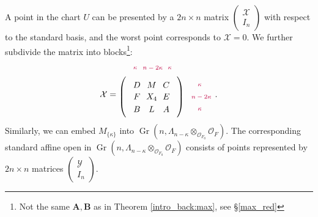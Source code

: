 \documentclass[pdflatex,sn-mathphys-num]{sn-jnl}%
\theoremstyle{thmstyleone}%
\theoremstyle{thmstyletwo}%
\numberwithin{equation}{subsection}
\theoremstyle{thmstylethree}%
\newcommand{\bA}{\ensuremath{\mathbf{A}}\xspace}
\newcommand{\bB}{\ensuremath{\mathbf{B}}\xspace}
\newcommand{\CO}{\ensuremath{\mathcal{O}}\xspace}
\newcommand{\CX}{\ensuremath{\mathcal{X}}\xspace}
\newcommand{\CY}{\ensuremath{\mathcal{Y}}\xspace}
\DeclareMathOperator{\Gr}{Gr}
\begin{document}
A point in the chart $U$ can be presented by a $2n\times n$ matrix $\left(\begin{matrix}\CX\\I_n\end{matrix}\right)$ with respect to the standard basis, and the worst point corresponds to $\CX=0$. 
We further subdivide the matrix into blocks\footnote{Not the same $\bA,\bB$ as in Theorem \ref{intro_back:max}, see \S \ref{max_red}}:
\begin{equation}\label{equ_chart:standard-X}
	\CX=
\begin{tikzpicture}[>=stealth,thick,baseline]
	\matrix [matrix of math nodes,left delimiter=(,right delimiter=)](A){ 
					D		&	M	&	C\\
					F	&	X_4		&	E\\
					B		&	L	&	A\\
				};
	\filldraw[purple] (2.2,0.5) circle (0pt) node [anchor=east]{\fontsize{7}{8} $\kappa$};
	\filldraw[purple] (2.6,0) circle (0pt) node [anchor=east]{\fontsize{7}{8} $n-2\kappa$};
	\filldraw[purple] (2.2,-0.5) circle (0pt) node [anchor=east]{\fontsize{7}{8} $\kappa$};
	\filldraw[purple] (-0.45,1.2) circle (0pt) node [anchor=east]{\fontsize{7}{8} $\kappa$};
	\filldraw[purple] (0.6,1.2) circle (0pt) node [anchor=east]{\fontsize{7}{8} $n-2\kappa$};
	\filldraw[purple] (0.7,1.2) circle (0pt) node [anchor=center]{\fontsize{7}{8} $\kappa$};
\end{tikzpicture}.
\end{equation}
Similarly, we can embed $M_{\{\kappa\}}$ into $\Gr(n,\Lambda_{n-\kappa}\otimes_{\CO_{F_0}}\CO_F)$.
The corresponding standard affine open in $\Gr(n,\Lambda_{n-\kappa}\otimes_{\CO_{F_0}}\CO_F)$ consists of points represented by $2n\times n$ matrices $\left(\begin{matrix}\CY\\ I_n\end{matrix}\right)$.
\end{document}
